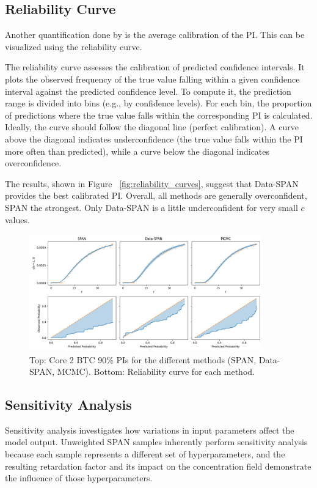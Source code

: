 \subsection{Reliability Curve}
Another quantification done by \cite{finn} is the average calibration of the PI. This can be visualized using the reliability curve.

The reliability curve assesses the calibration of predicted confidence intervals. It plots the observed frequency of the true value falling within a given confidence interval against the predicted confidence level. To compute it, the prediction range is divided into bins (e.g., by confidence levels). For each bin, the proportion of predictions where the true value falls within the corresponding PI is calculated. Ideally, the curve should follow the diagonal line (perfect calibration). A curve above the diagonal indicates underconfidence (the true value falls within the PI more often than predicted), while a curve below the diagonal indicates overconfidence.

The results, shown in Figure ~\vref{fig:reliability_curves}, suggest that Data-SPAN provides the best calibrated PI. Overall, all methods are generally overconfident, SPAN the strongest. Only Data-SPAN is a little underconfident for very small $c$ values.

\begin{figure}
    \centering
    \includegraphics[width=0.9\textwidth]{figs/reliability_curves.png}
    \caption{Top: Core 2 BTC 90\% PIs for the different methods (SPAN, Data-SPAN, MCMC). Bottom: Reliability curve for each method.}
    \label{fig:reliability_curves}
\end{figure}


\subsection{Sensitivity Analysis}
\label{sec:sensitivity}
Sensitivity analysis investigates how variations in input parameters affect the model output. Unweighted SPAN samples inherently perform sensitivity analysis because each sample represents a different set of hyperparameters, and the resulting retardation factor and its impact on the concentration field demonstrate the influence of those hyperparameters.

